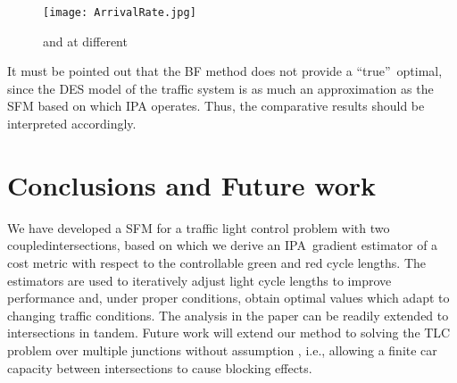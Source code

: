 \documentclass{ifacconf}\usepackage{graphicx}
\begin{document}
\begin{figure}[tbh]
\centering
\texttt{[image: ArrivalRate.jpg]}\caption{ and  at different }\label{arrivalRate}\end{figure}

It must be pointed out that the BF method does not provide a \textquotedblleft true\textquotedblright\ optimal, since the DES model of the traffic system is as much an approximation as the SFM based on which IPA operates. Thus, the comparative results should be interpreted accordingly. 

\section{Conclusions and Future work}

We have developed a SFM for a traffic light control problem with two
coupledintersections, based on which we derive an IPA\ gradient estimator of a
cost metric with respect to the controllable green and red cycle lengths. The
estimators are used to iteratively adjust light cycle lengths to improve
performance and, under proper conditions, obtain optimal values which adapt to
changing traffic conditions. The analysis in the paper can be readily extended
to  intersections in tandem. Future work will extend our method to solving
the TLC problem over multiple junctions without assumption , i.e.,
allowing a finite car capacity between intersections to cause blocking effects.






\end{document}
